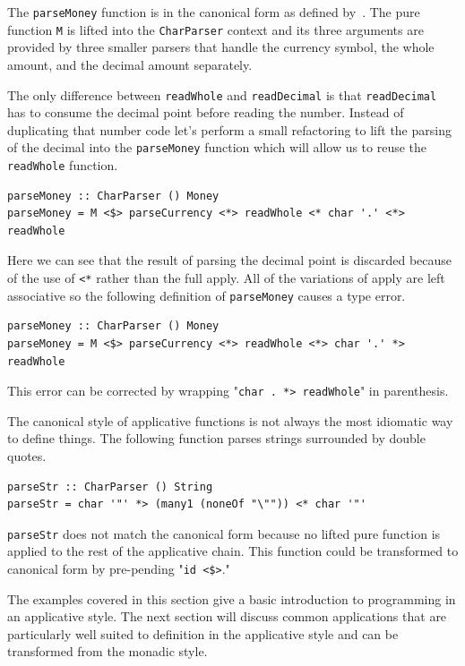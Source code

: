 The \texttt{parseMoney} function is in the canonical form as defined by~\cite{mcbrideIdioms}. The pure function \texttt{M} is lifted into the \texttt{CharParser} context and its three arguments are provided by three smaller parsers that handle the currency symbol, the whole amount, and the decimal amount separately. 

The only difference between \texttt{readWhole} and \texttt{readDecimal} is that \texttt{readDecimal} has to consume the decimal point before reading the number. Instead of duplicating that number code let's perform a small refactoring to lift the parsing of the decimal into the \texttt{parseMoney} function which will allow us to reuse the \texttt{readWhole} function.

 \begin{lstlisting}[frame=tblr]
parseMoney :: CharParser () Money
parseMoney = M <$> parseCurrency <*> readWhole <* char '.' <*> readWhole
 \end{lstlisting}
 
 Here we can see that the result of parsing the decimal point is discarded because of the use of \texttt{<*} rather than the full apply. All of the variations of apply are left associative so the following definition of \texttt{parseMoney} causes a type error.
 
  \begin{lstlisting}[frame=tblr]
parseMoney :: CharParser () Money
parseMoney = M <$> parseCurrency <*> readWhole <*> char '.' *> readWhole
 \end{lstlisting}
 
This error can be corrected by wrapping "\texttt{char \textquotesingle.\textquotesingle~*> readWhole}" in parenthesis. 
 
The canonical style of applicative functions is not always the most idiomatic way to define things. The following function parses strings surrounded by double quotes.

\begin{lstlisting}[frame=tblr]
parseStr :: CharParser () String 
parseStr = char '"' *> (many1 (noneOf "\"")) <* char '"'
\end{lstlisting}

\texttt{parseStr} does not match the canonical form because no lifted pure function is applied to the rest of the applicative chain. This function could be transformed to canonical form by pre-pending "\texttt{id <\$>}."

The examples covered in this section give a basic introduction to programming in an applicative style. The next section will discuss common applications that are particularly well suited to definition in the applicative style and can be transformed from the monadic style. 

